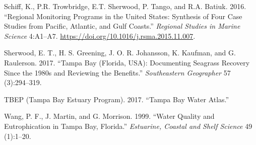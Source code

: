 \documentclass[]{article}
\begin{document}
\leavevmode\hypertarget{ref-Schiff16}{}%
Schiff, K., P.R. Trowbridge, E.T. Sherwood, P. Tango, and R.A. Batiuk.
2016. ``Regional Monitoring Programs in the United States: Synthesis of
Four Case Studies from Pacific, Atlantic, and Gulf Coasts.''
\emph{Regional Studies in Marine Science} 4:A1--A7.
\url{https://doi.org/10.1016/j.rsma.2015.11.007}.

\leavevmode\hypertarget{ref-Sherwood17}{}%
Sherwood, E. T., H. S. Greening, J. O. R. Johansson, K. Kaufman, and G.
Raulerson. 2017. ``Tampa Bay (Florida, USA): Documenting Seagrass
Recovery Since the 1980s and Reviewing the Benefits.''
\emph{Southeastern Geographer} 57 (3):294--319.

\leavevmode\hypertarget{ref-TBEP17}{}%
TBEP (Tampa Bay Estuary Program). 2017. ``Tampa Bay Water Atlas.''

\leavevmode\hypertarget{ref-Wang99}{}%
Wang, P. F., J. Martin, and G. Morrison. 1999. ``Water Quality and
Eutrophication in Tampa Bay, Florida.'' \emph{Estuarine, Coastal and
Shelf Science} 49 (1):1--20.
\end{document}

